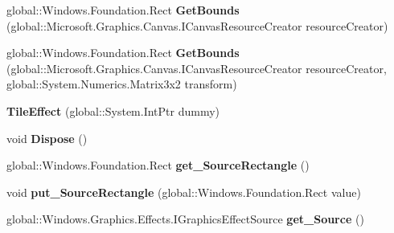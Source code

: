 \begin{DoxyCompactItemize}
\mbox{\label{class_microsoft_1_1_graphics_1_1_canvas_1_1_effects_1_1_tile_effect_ab750c6e9b586d8a61f8aa73d8c345adc}} 
global\+::\+Windows.\+Foundation.\+Rect {\bfseries Get\+Bounds} (global\+::\+Microsoft.\+Graphics.\+Canvas.\+I\+Canvas\+Resource\+Creator resource\+Creator)
\item 
\mbox{\label{class_microsoft_1_1_graphics_1_1_canvas_1_1_effects_1_1_tile_effect_abe0663f59fe2ba4b80be6f46ca4198c8}} 
global\+::\+Windows.\+Foundation.\+Rect {\bfseries Get\+Bounds} (global\+::\+Microsoft.\+Graphics.\+Canvas.\+I\+Canvas\+Resource\+Creator resource\+Creator, global\+::\+System.\+Numerics.\+Matrix3x2 transform)
\item 
\mbox{\label{class_microsoft_1_1_graphics_1_1_canvas_1_1_effects_1_1_tile_effect_aa107fd2365bf30bb4bc757c8f23570cb}} 
{\bfseries Tile\+Effect} (global\+::\+System.\+Int\+Ptr dummy)
\item 
\mbox{\label{class_microsoft_1_1_graphics_1_1_canvas_1_1_effects_1_1_tile_effect_a82911fbdb206a47dd070948da25b15b2}} 
void {\bfseries Dispose} ()
\item 
\mbox{\label{class_microsoft_1_1_graphics_1_1_canvas_1_1_effects_1_1_tile_effect_ab1844baf6fd7b1291017af32256cb757}} 
global\+::\+Windows.\+Foundation.\+Rect {\bfseries get\+\_\+\+Source\+Rectangle} ()
\item 
\mbox{\label{class_microsoft_1_1_graphics_1_1_canvas_1_1_effects_1_1_tile_effect_a1a2a8a43669447290f1788aeafe2a795}} 
void {\bfseries put\+\_\+\+Source\+Rectangle} (global\+::\+Windows.\+Foundation.\+Rect value)
\item 
\mbox{\label{class_microsoft_1_1_graphics_1_1_canvas_1_1_effects_1_1_tile_effect_a7915c13a5ebe9c3c5289e7a8098f8c6a}} 
global\+::\+Windows.\+Graphics.\+Effects.\+I\+Graphics\+Effect\+Source {\bfseries get\+\_\+\+Source} ()

\end{DoxyCompactItemize}
